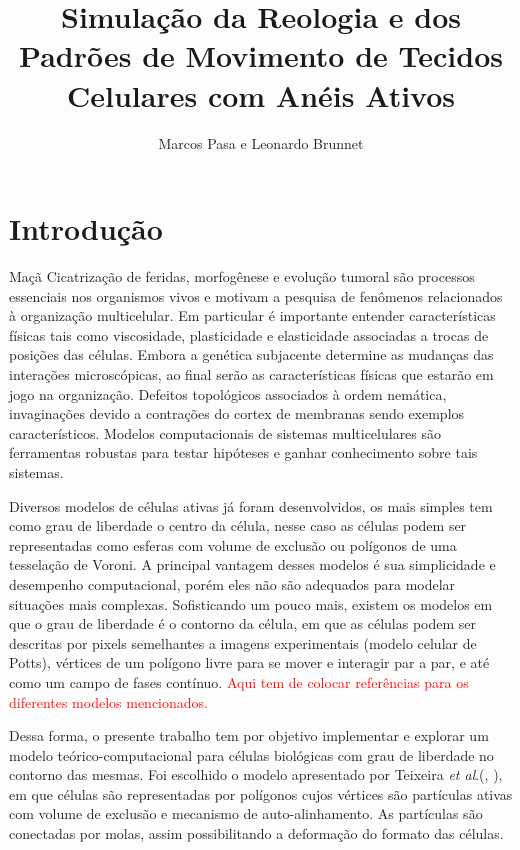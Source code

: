 \documentclass{article}
\title{Simulação da Reologia e dos Padrões de Movimento de Tecidos Celulares com Anéis Ativos}
\author{Marcos Pasa e Leonardo Brunnet}
\theoremstyle{definition}
\begin{document}
\maketitle

\section{Introdução}
Maçã Cicatrização de feridas, morfogênese e evolução tumoral são processos essenciais nos organismos vivos e motivam a pesquisa de fenômenos relacionados à organização multicelular. Em particular é importante entender características físicas tais como viscosidade, plasticidade e elasticidade associadas a trocas de posições das células. Embora a genética subjacente determine as mudanças das interações microscópicas, ao final serão as características físicas que estarão em jogo na organização. Defeitos topológicos associados à ordem nemática, invaginações devido a contrações do cortex de membranas sendo  exemplos característicos. Modelos computacionais de sistemas multicelulares são ferramentas robustas para testar hipóteses e ganhar conhecimento sobre tais sistemas.

Diversos modelos de células ativas já foram desenvolvidos, os mais simples tem como grau de liberdade o centro da célula, nesse caso as células podem ser representadas como esferas com volume de exclusão ou polígonos de uma tesselação de Voroni. A principal vantagem desses modelos é sua simplicidade e desempenho computacional, porém eles não são adequados para modelar situações mais complexas. Sofisticando um pouco mais, existem os modelos em que o grau de liberdade é o contorno da célula, em que as células podem ser descritas por pixels semelhantes a imagens experimentais (modelo celular de Potts), vértices de um polígono livre para se mover e interagir par a par, e até como um campo de fases contínuo.
\textcolor{red}{Aqui tem de colocar referências para os diferentes modelos mencionados.}

Dessa forma, o presente trabalho tem por objetivo implementar e explorar um modelo teórico-computacional para células biológicas com grau de liberdade no contorno das mesmas. Foi escolhido o modelo apresentado por Teixeira \textit{et al}.(\cite{teixeira_single_2021}, \cite{teixeira_segregation_2024}), em que células são representadas por polígonos cujos vértices são partículas ativas com volume de exclusão e mecanismo de auto-alinhamento. As partículas são conectadas por molas, assim possibilitando a deformação do formato das células.
\end{document}
